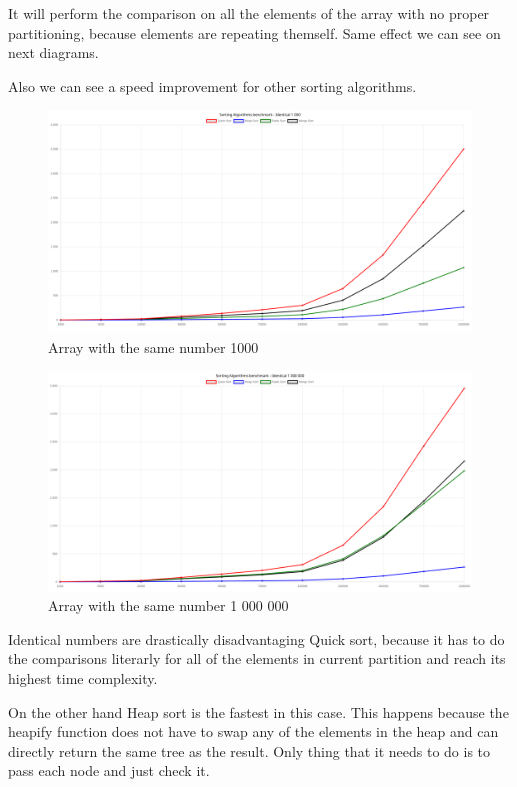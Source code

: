 \documentclass[12pt]{article}
\begin{document}
It will perform the comparison on all the elements of the array with no proper partitioning, because elements are repeating themself. Same effect we can see on next diagrams.

Also we can see a speed improvement for other sorting algorithms.


\begin{figure}[h]
    \centering
    \includegraphics[width=1\textwidth]{iden1000.png}
    \caption{Array with the same number 1000}
    \label{fig:identical1000}
\end{figure}

\begin{figure}[h]
    \centering
    \includegraphics[width=1\textwidth]{iden1000000.png}
    \caption{Array with the same number 1 000 000}
    \label{fig:identical1000000}
\end{figure}

\clearpage
Identical numbers are drastically disadvantaging Quick sort, because it has to 
do the comparisons literarly for all of the elements in current partition and reach its highest 
time complexity. 

On the other hand Heap sort is the fastest in this case. This happens because the heapify function does not 
have to swap any of the elements in the heap and can directly return the same 
tree as the result. Only thing that it needs to do is to pass each node and just check it.
\end{document}
